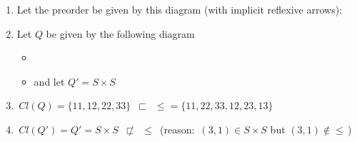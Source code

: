 \begin{enumerate}
    \item Let the preorder be given by this diagram (with implicit reflexive arrows): 
    \item Let $Q$ be given by the following diagram
          \begin{itemize}
            \item {}
            \item and let $Q'=S\times S$
          \end{itemize}
    \item \,$Cl(Q) = \{11,12,22,33\}$\, $\sqsubset$ \,$\leq = \{11,22,33,12,23,13\}$\,
    \item \,$Cl(Q') = Q' = S \times S$\, $\not \sqsubset$ \,$\leq$\,  (reason: \,$(3,1) \in S \times S$ but $(3,1) \not \in \leq$\,)
  \end{enumerate}